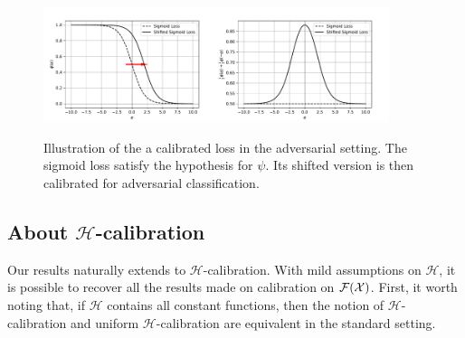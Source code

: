     
    



\begin{figure}
    \centering
    \includegraphics[width = 0.45\textwidth]{sections/3_calibration/images/calibrated_loss.pdf}\includegraphics[width = 0.45\textwidth]{sections/3_calibration/images/calibrated_loss_ass.pdf}
    \caption{Illustration of the a calibrated loss in the adversarial setting. The sigmoid loss satisfy the hypothesis for $\psi$. Its shifted version is then calibrated for adversarial classification.}
    \label{fig:cal}
\end{figure}






\subsection{About $\mathcal{H}$-calibration}
\label{sec:hcal}
Our results naturally extends to $\mathcal{H}$-calibration. With mild assumptions on $\mathcal{H}$, it is possible to recover all the results made on calibration on $\mathcal{F}(\mathcal{X})$. First, it worth noting that, if $\mathcal{H}$ contains all constant functions, then the notion of $\mathcal{H}$-calibration and uniform $\mathcal{H}$-calibration are equivalent in the standard setting.




